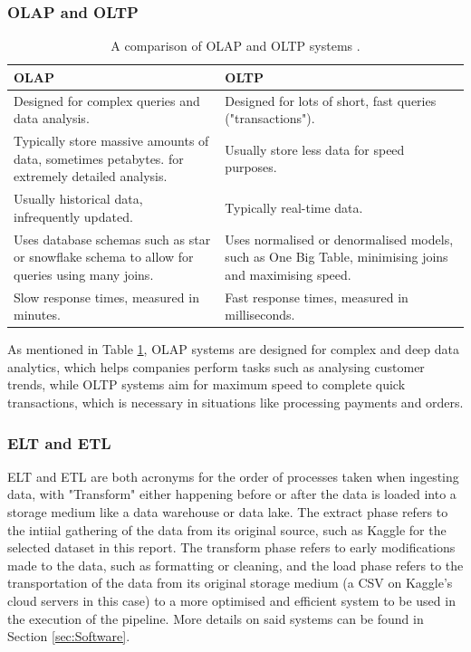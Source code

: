 \documentclass[12pt]{report}
\begin{document}
\subsubsection{OLAP and OLTP}

\begin{table}[H]
    \centering
        \begin{tabular}{ |p{}| p{}|}
            \hline
            \cellcolor{blue!25}OLAP & \cellcolor{blue!25}OLTP\\
            \hline
            Designed for complex queries and data analysis.
            & Designed for lots of short, fast queries ("transactions").\\
            \hline
            Typically store massive amounts of data, sometimes petabytes.
            for extremely detailed analysis. 
            & Usually store less data for speed purposes.\\
            \hline
            Usually historical data, infrequently updated. 
            & Typically real-time data.\\
            \hline 
            Uses database schemas such as star or snowflake schema to allow for queries using many joins. 
            & Uses normalised or denormalised models, such as One Big Table, minimising joins and maximising speed.\\
            \hline
            Slow response times, measured in minutes. 
            & Fast response times, measured in milliseconds.\\
            \hline
    \end{tabular}
    \caption{A comparison of OLAP and OLTP systems \autocite{aws_oltp_nodate}.}\label{tab:OLAP-OLTP}
\end{table}

As mentioned in Table \ref{tab:OLAP-OLTP}, OLAP systems are designed for complex and deep data analytics, which helps 
companies perform tasks such as analysing customer trends, while OLTP systems aim for maximum speed to complete quick transactions, 
which is necessary in situations like processing payments and orders.

\subsubsection{ELT and ETL}
ELT and ETL are both acronyms for the order of processes taken when ingesting data, with "Transform" either 
happening before or after the data is loaded into a storage medium like a data warehouse or data lake. 
The extract phase refers to the intiial gathering of the data from its original source, such as Kaggle for 
the selected dataset in this report. The transform phase refers to early modifications made to the data, such 
as formatting or cleaning, and the load phase refers to the transportation of the data from its original storage
medium (a CSV on Kaggle's cloud servers in this case) to a more optimised and efficient system to be used 
in the execution of the pipeline. More details on said systems can be found in Section \ref{sec:Software}.
\end{document}
